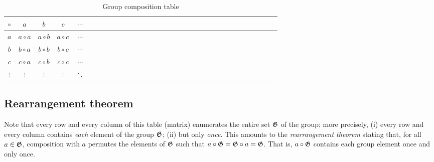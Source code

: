 \begin{table}
\begin{center}
\begin{tabular}{c|ccccccccccccccccccccccccccccccc}
$\circ$&$a$&$b$&$c$&$\cdots$\\
\hline
$a$&$a \circ a$&$a \circ b$&$a \circ c$&$\cdots$\\
$b$&$b \circ a$&$b \circ b$&$b \circ c$&$\cdots$  \\
$c$&$c \circ a$&$c \circ b$&$c \circ c$&$\cdots$    \\
$\vdots$&$\vdots$&$\vdots$&$\vdots$&$\ddots$
\end{tabular}
\caption{Group composition table\label{2017-m-ch-gt-t-gct}}
\end{center}
\end{table}

\subsection{Rearrangement theorem}

Note that every row and every column of this table (matrix) enumerates the entire set ${\frak G}$ of the group;
more precisely, (i)  every row and every column
contains {\em each} element of the group ${\frak G}$;
(ii) but only  {\em once}.
This amounts to the {\em rearrangement theorem}
stating that, for all $a \in  {\frak G}$, composition with $a$ permutes the elements of ${\frak G}$ such that
$a \circ {\frak G} =  {\frak G} \circ a = {\frak G}$.
That is, $a \circ {\frak G}$ contains each group element once and only once.

